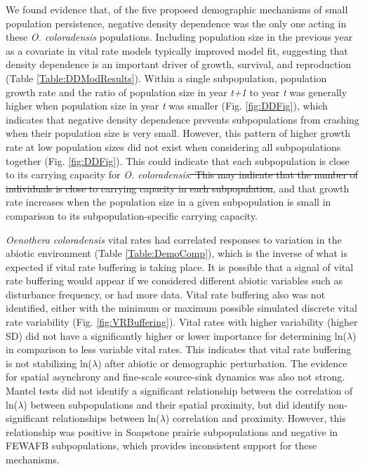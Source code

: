 \documentclass[12pt, letterpaper]{article}
\begin{document}
We found evidence that, of the five proposed demographic mechanisms of small population persistence, negative density dependence was the only one acting in these \textit{O. coloradensis} populations. Including population size in the previous year as a covariate in vital rate models typically improved model fit, suggesting that density dependence is an important driver of growth, survival, and reproduction (Table \ref{Table:DDModResults}). Within a single subpopulation, population growth rate and the ratio of population size in year \textit{t+1} to year \textit{t} was generally higher when population size in year \textit{t} was smaller (Fig. \ref{fig:DDFig}), which indicates that negative density dependence prevents subpopulations from crashing when their population size is very small.  However, this pattern of higher growth rate at low population sizes did not exist when considering all subpopulations together (Fig. \ref{fig:DDFig}). This could indicate that each subpopulation is close to its carrying capacity for \textit{O. coloradensis}\sout{. This may indicate that the number of individuals is close to carrying capacity in each subpopulation}, and that growth rate increases when the population size in a given subpopulation is small in comparison to its subpopulation-specific carrying capacity. 

\textit{Oenothera coloradensis} vital rates had correlated responses to variation in the abiotic environment (Table \ref{Table:DemoComp}), which is the inverse of what is expected if vital rate buffering is taking place. It is possible that a signal of vital rate buffering would appear if we considered different abiotic variables such as disturbance frequency, or had more data. Vital rate buffering also was not identified, either with the minimum or maximum possible simulated discrete vital rate variability (Fig. \ref{fig:VRBuffering}). Vital rates with higher variability (higher SD) did not have a significantly higher or lower importance for determining ln($\lambda$) in comparison to less variable vital rates. This indicates that vital rate buffering is not stabilizing ln($\lambda$) after abiotic or demographic perturbation. The evidence for spatial asynchrony and fine-scale source-sink dynamics was also not strong. Mantel tests did not identify a significant relationship between the correlation of ln($\lambda$) between subpopulations and their spatial proximity, but did identify non-significant relationships between ln($\lambda$) correlation and proximity. However, this relationship was positive in Soapstone prairie subpopulations and negative in FEWAFB subpopulations, which provides inconsistent support for these mechanisms.  
\end{document}
